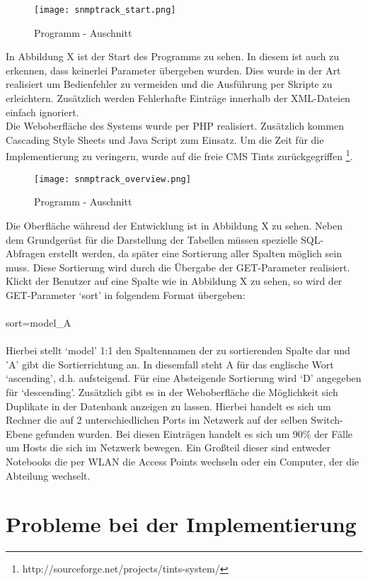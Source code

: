 \begin{figure}[H]
\centering
\texttt{[image: snmptrack\_start.png]}
\caption{Programm - Auschnitt}
\label{fig:show_s1_s2_p1_n1}
\end{figure}
In Abbildung X ist der Start des Programms zu sehen. In diesem ist auch zu erkennen, dass keinerlei Parameter übergeben wurden. Dies wurde in der Art realisiert um Bedienfehler zu vermeiden und die Ausführung per Skripte zu erleichtern. Zusätzlich werden Fehlerhafte Einträge innerhalb der XML-Dateien einfach ignoriert.\\
Die Weboberfläche des Systems wurde per PHP realisiert. Zusätzlich kommen Cascading Style Sheets und Java Script zum Einsatz. Um die Zeit für die Implementierung zu veringern, wurde auf die freie CMS Tints zurückgegriffen \footnote{http://sourceforge.net/projects/tints-system/}.
\\
\begin{figure}[H]
\centering
\texttt{[image: snmptrack\_overview.png]}
\caption{Programm - Auschnitt}
\label{fig:show_s1_s2_p1_n1}
\end{figure}
Die Oberfläche während der Entwicklung ist in Abbildung X zu sehen.
Neben dem Grundgerüst für die Darstellung der Tabellen müssen spezielle SQL-Abfragen erstellt werden, da später eine Sortierung aller Spalten möglich sein muss.
Diese Sortierung wird durch die Übergabe der GET-Parameter realisiert. Klickt der Benutzer auf eine Spalte wie in Abbildung X zu sehen, so wird der GET-Parameter ‘sort’ in folgendem Format übergeben:\\
\\
sort=model\_A\\
\\
Hierbei stellt ‘model’ 1:1 den Spaltennamen der zu sortierenden Spalte dar und 'A' gibt die Sortierrichtung an. In diesemfall steht A für das englische Wort ‘ascending’, d.h. aufsteigend. Für eine Absteigende Sortierung wird ‘D’ angegeben für ‘descending’.
Zusätzlich gibt es in der Weboberfläche die Möglichkeit sich Duplikate in der Datenbank anzeigen zu lassen. Hierbei handelt es sich um Rechner die auf 2 unterschiedlichen Ports im Netzwerk auf der selben Switch-Ebene gefunden wurden. Bei diesen Einträgen handelt es sich um 90\% der Fälle um Hosts die sich im Netzwerk bewegen. Ein Großteil dieser sind entweder Notebooks die per WLAN die Access Points wechseln oder ein Computer, der die Abteilung wechselt.

\section{Probleme bei der Implementierung}
\label{sec:probimp}

